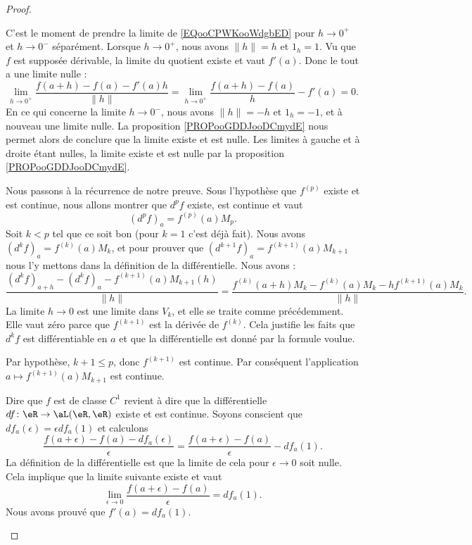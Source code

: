 \begin{proof}
\begin{subproof}
		C'est le moment de prendre la limite de \eqref{EQooCPWKooWdgbED} pour \( h\to 0^+\) et \( h\to 0^-\) séparément. Lorsque \( h\to 0^+\), nous avons \( \| h \|=h\) et \( 1_h=1\). Vu que \( f\) est supposée dérivable, la limite du quotient existe et vaut \( f'(a)\). Donc le tout a une limite nulle :
		\begin{equation}
			\lim_{h\to 0^+} \frac{ f(a+h)-f(a)-f'(a)h }{ \| h \| }=\lim_{h\to 0^+}\frac{ f(a+h)-f(a) }{  h  }-f'(a)=0.
		\end{equation}
		En ce qui concerne la limite \( h\to 0^-\), nous avons \( \| h \|=-h\) et \( 1_h=-1\), et à nouveau une limite nulle. La proposition \ref{PROPooGDDJooDCmydE} nous permet alors de conclure que la limite existe et est nulle. Les limites à gauche et à droite étant nulles, la limite existe et est nulle par la proposition \ref{PROPooGDDJooDCmydE}.

		Nous passons à la récurrence de notre preuve. Sous l'hypothèse que \( f^{(p)}\) existe et est continue, nous allons montrer que \( d^pf\) existe, est continue et vaut
		\begin{equation}
			(d^pf)_a=f^{(p)}(a)M_p.
		\end{equation}
		Soit \( k<p\) tel que ce soit bon (pour \( k=1\) c'est déjà fait). Nous avons \( (d^kf)_a=f^{(k)}(a)M_k\), et pour prouver que \( (d^{k+1}f)_a=f^{(k+1)}(a)M_{k+1}\) nous l'y mettons dans la définition de la différentielle. Nous avons :
		\begin{equation}
			\frac{ (d^kf)_{a+h}-(d^kf)_a-f^{(k+1)}(a)M_{k+1}(h) }{ \| h \| }=\frac{ f^{(k)}(a+h)M_k-f^{(k)}(a)M_k-hf^{(k+1)}(a)M_k }{ \| h \| }.
		\end{equation}
		La limite \( h\to 0\) est une limite dans \( V_k\), et elle se traite comme précédemment. Elle vaut zéro parce que \( f^{(k+1)}\) est la dérivée de \( f^{(k)}\). Cela justifie les faits que \( d^kf\) est différentiable en \( a\) et que la différentielle est donné par la formule voulue.

		Par hypothèse, \( k+1\leq p\), donc \( f^{(k+1)}\) est continue. Par conséquent l'application \( a\mapsto f^{(k+1)}(a)M_{k+1}\) est continue.

		Dire que \( f\) est de classe \( C^1\) revient à dire que la différentielle \( df\colon \eR\to \aL(\eR,\eR)\) existe et est continue. Soyons conscient que \( df_a(\epsilon)=\epsilon df_a(1)\) et calculons
		\begin{equation}
			\frac{ f(a+\epsilon)-f(a)-df_a(\epsilon) }{ \epsilon }=\frac{ f(a+\epsilon)-f(a) }{ \epsilon }-df_a(1).
		\end{equation}
		La définition de la différentielle est que la limite de cela pour \( \epsilon\to 0\) soit nulle. Cela implique que la limite suivante existe et vaut
		\begin{equation}
			\lim_{\epsilon\to 0}\frac{ f(a+\epsilon)-f(a) }{ \epsilon }=df_a(1).
		\end{equation}
		Nous avons prouvé que \( f'(a)=df_a(1)\).


\end{subproof}
\end{proof}

